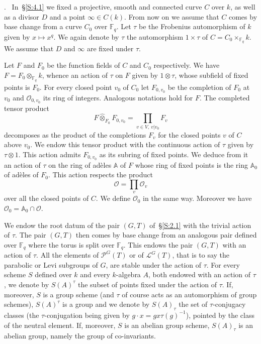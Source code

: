 \documentclass[12pt,a4paper,oneside,english,leqno]{smfart}
\makeatletter
\numberwithin{equation}{subsection}
\numberwithin{theo}{subsection}
\newenvironment{paragr}[1][]{\medskip\refstepcounter{subsection}%
  \par\noindent\hspace*{\parindent}\thesubsection.\ \emph{#1}%
  \@ifundefined{@empty}{}{}\ignorespaces}{\medskip}
\theoremstyle{plain}
\theoremstyle{definition}
\theoremstyle{remark}
\newcommand{\AAA}{\mathbb{A}}
\newcommand{\Fq}{\mathbb{F}_q}
\newcommand{\oc}{\mathcal{O}}
\newcommand{\lc}{\mathcal{L}}
\newcommand{\pc}{\mathcal{P}}
\makeatother
\begin{document}
\begin{paragr}\label{S:11.1}
In~\S\ref{S:4.1} we fixed a projective, smooth and connected curve $C$ over $k$, as well as a divisor $D$ and a point $\infty\in C(k)$. From now on we assume that $C$ comes by base change from a curve $C_0$ over $\Fq$. Let $\tau$ be the Frobenius automorphism of $k$ given by $x\mapsto x^q$. We again denote by $\tau$ the automorphism $1\times\tau$ of $C=C_0\times_{\Fq}k$. We assume that $D$ and $\infty$ are fixed under $\tau$.

Let $F$ and $F_0$ be the function fields of $C$ and $C_0$ respectively. We have $F=F_0\otimes_{\Fq}k$, whence an action of $\tau$ on $F$ given by $1\otimes\tau$, whose subfield of fixed points is $F_0$. For every closed point $v_0$ of $C_0$ let $F_{0,v_0}$ be the completion of $F_0$ at $v_0$ and $\oc_{0,v_0}$ its ring of integers. Analogous notations hold for $F$. The completed tensor product
$$
F\hat{\otimes}_{F_0}F_{0,v_0}=\prod_{v\in V,\ v|v_0}F_v
$$
decomposes as the product of the completions $F_v$ for the closed points $v$ of $C$ above $v_0$. We endow this tensor product with the continuous action of $\tau$ given by $\tau\otimes 1$. This action admits $F_{0,v_0}$ as its subring of fixed points. We deduce from it an action of $\tau$ on the ring of adèles $\AAA$ of $F$ whose ring of fixed points is the ring $\AAA_0$ of adèles of $F_0$. This action respects the product
$$
\oc=\prod_v\oc_v
$$
over all the closed points of $C$. We define $\oc_0$ in the same way. Moreover we have $\oc_0=\AAA_0\cap\oc$.

We endow the root datum of the pair $(G,T)$ of~\S\ref{S:2.1} with the trivial action of $\tau$. The pair $(G,T)$ then comes by base change from an analogous pair defined over $\Fq$ where the torus is split over $\Fq$. This endows the pair $(G,T)$ with an action of $\tau$. All the elements of $\pc^G(T)$ or of $\lc^G(T)$, that is to say the parabolic or Levi subgroups of $G$, are stable under the action of $\tau$. For every scheme $S$ defined over $k$ and every $k$-algebra $A$, both endowed with an action of $\tau$, we denote by $S(A)^\tau$ the subset of points fixed under the action of $\tau$. If, moreover, $S$ is a group scheme (and $\tau$ of course acts as an automorphism of group schemes), $S(A)^\tau$ is a group and we denote by $S(A)_\tau$ the set of $\tau$-conjugacy classes (the $\tau$-conjugation being given by $g\cdot x=gx\tau(g)^{-1}$), pointed by the class of the neutral element. If, moreover, $S$ is an abelian group scheme, $S(A)_\tau$ is an abelian group, namely the group of co-invariants.
\end{paragr}
\end{document}
